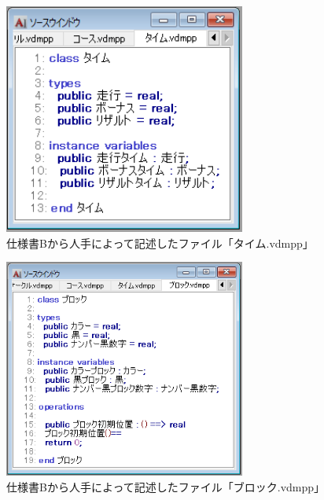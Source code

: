 \begin{figure}[tp]
    \begin{center}
    \includegraphics[width=300]{image/speB_vdm4.PNG}
    \caption{仕様書Bから人手によって記述したファイル「タイム.vdmpp」}
    \label{fig:speB_vdm4}
    \end{center}
\end{figure}

\begin{figure}[tp]
    \begin{center}
    \includegraphics[width=300]{image/speB_vdm5.PNG}
    \caption{仕様書Bから人手によって記述したファイル「ブロック.vdmpp」}
    \label{fig:speB_vdm5}
    \end{center}
\end{figure}


